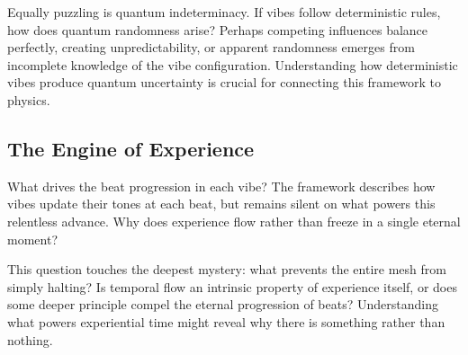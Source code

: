Equally puzzling is quantum indeterminacy. If vibes follow deterministic rules, how does quantum randomness arise? Perhaps competing influences balance perfectly, creating unpredictability, or apparent randomness emerges from incomplete knowledge of the vibe configuration. Understanding how deterministic vibes produce quantum uncertainty is crucial for connecting this framework to physics.

\subsection{The Engine of Experience}

What drives the beat progression in each vibe? The framework describes how vibes update their tones at each beat, but remains silent on what powers this relentless advance. Why does experience flow rather than freeze in a single eternal moment?

This question touches the deepest mystery: what prevents the entire mesh from simply halting? Is temporal flow an intrinsic property of experience itself, or does some deeper principle compel the eternal progression of beats? Understanding what powers experiential time might reveal why there is something rather than nothing.

